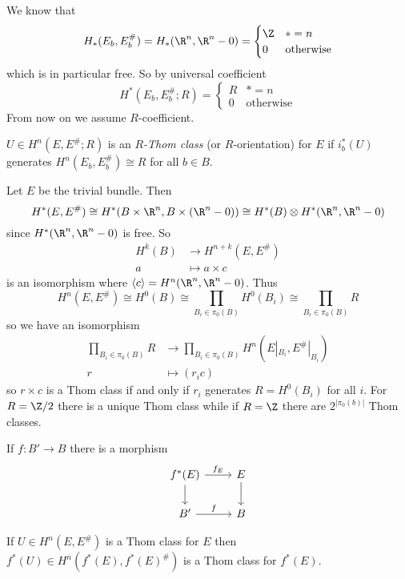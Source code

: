 \documentclass[a4paper]{article}
\begin{document}
We know that
\[
  H_*(E_b, E_b^\#) = H_*(\R^n, \R^n - 0) =
  \begin{cases}
    \Z & * = n \\
    0 & \text{otherwise}
  \end{cases}
\]
which is in particular free. So by universal coefficient
\[
  H^*(E_b, E_b^\#; R) =
  \begin{cases}
    R & * = n \\
    0 & \text{otherwise}
  \end{cases}
\]
From now on we assume \(R\)-coefficient.

\begin{definition}
  \(U \in H^n(E, E^\#; R)\) is an \emph{\(R\)-Thom class} (or \(R\)-orientation) for \(E\) if \(i_b^*(U)\) generates \(H^n(E_b, E_b^\#) \cong R\) for all \(b \in B\).
\end{definition}

\begin{eg}
  Let \(E\) be the trivial bundle. Then
  \[
    H^*(E, E^\#) \cong H^*(B \times \R^n, B \times (\R^n - 0)) \cong H^*(B) \otimes H^*(\R^n, \R^n - 0)
  \]
  since \(H^*(\R^n, \R^n - 0)\) is free. So
  \begin{align*}
    H^k(B) &\to H^{n + k}(E, E^\#) \\
    a &\mapsto a \times c
  \end{align*}
  is an isomorphism where \(\langle c \rangle = H^n(\R^n, \R^n - 0)\). Thus
  \[
    H^n(E, E^\#) \cong H^0(B) \cong \prod_{B_i \in \pi_0(B)} H^0(B_i) \cong \prod_{B_i \in \pi_0(B)} R
  \]
  so we have an isomorphism
  \begin{align*}
    \prod_{B_i \in \pi_0(B)} R &\to \prod_{B_i \in \pi_0(B)} H^n(E|_{B_i}, E^\#|_{B_i}) \\
    r &\mapsto (r_ic)
  \end{align*}
  so \(r \times c\) is a Thom class if and only if \(r_i\) generates \(R = H^0(B_i)\) for all \(i\). For \(R = \Z/2\) there is a unique Thom class while if \(R = \Z\) there are \(2^{|\pi_0(b)|}\) Thom classes.
\end{eg}

If \(f: B' \to B\) there is a morphism
\[
  \begin{tikzcd}
    f^*(E) \ar[r, "f_E"] \ar[d] & E \ar[d] \\
    B' \ar[r, "f"] & B
  \end{tikzcd}
\]

\begin{lemma}
  If \(U \in H^n(E, E^\#)\) is a Thom class for \(E\) then \(f^*(U) \in H^n(f^*(E), f^*(E)^\#)\) is a Thom class for \(f^*(E)\).
\end{lemma}
\end{document}

